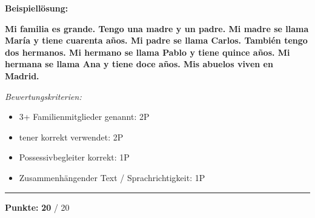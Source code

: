 \documentclass[11pt, a4paper]{article}
\newcommand{\maxpunkte}{20}
\newcommand{\loesung}[1]{\textcolor{loesung}{\textbf{#1}}}
\begin{document}
\textbf{Beispiellösung:}

\loesung{Mi familia es grande. Tengo una madre y un padre. Mi madre se llama María y tiene cuarenta años. Mi padre se llama Carlos. También tengo dos hermanos. Mi hermano se llama Pablo y tiene quince años. Mi hermana se llama Ana y tiene doce años. Mis abuelos viven en Madrid.}

\vspace{1em}

\textit{\textcolor{grau}{Bewertungskriterien:}}
\begin{itemize}
    \item 3+ Familienmitglieder genannt: 2P
    \item tener korrekt verwendet: 2P
    \item Possessivbegleiter korrekt: 1P
    \item Zusammenhängender Text / Sprachrichtigkeit: 1P
\end{itemize}


\vspace{20pt}
\hrule
\vspace{10pt}

\begin{flushright}
\textbf{Punkte:} \loesung{\maxpunkte} / \maxpunkte
\end{flushright}
\end{document}
